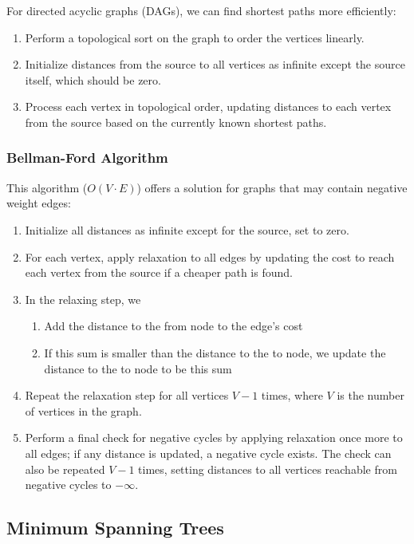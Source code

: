\documentclass{article}
\begin{document}
For directed acyclic graphs (DAGs), we can find shortest paths more efficiently:

\begin{enumerate}
    \item Perform a topological sort on the graph to order the vertices linearly.
    \item Initialize distances from the source to all vertices as infinite except the source itself, which should be zero.
    \item Process each vertex in topological order, updating distances to each vertex from the source based on the currently known shortest paths.
\end{enumerate}

\subsubsection{Bellman-Ford Algorithm}

This algorithm ($O(V \cdot E)$) offers a solution for graphs that may contain negative weight edges:
\begin{enumerate}
    \item Initialize all distances as infinite except for the source, set to zero.
    \item For each vertex, apply relaxation to all edges by updating the cost to reach each vertex from the source if a cheaper path is found.
    \item In the relaxing step, we
    \begin{enumerate}
        \item Add the distance to the from node to the edge's cost
        \item If this sum is smaller than the distance to the to node, we update the distance to the to node to be this sum
    \end{enumerate}
    \item Repeat the relaxation step for all vertices $V-1$ times, where $V$ is the number of vertices in the graph.
    \item Perform a final check for negative cycles by applying relaxation once more to all edges; if any distance is updated, a negative cycle exists. The check can also be repeated $V-1$ times, setting distances to all vertices reachable from negative cycles to $-\infty$. 
\end{enumerate}

\subsection{Minimum Spanning Trees}
\end{document}
